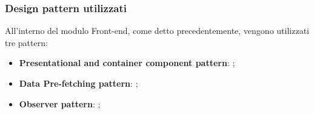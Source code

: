 \subsubsection{Design pattern utilizzati}
All'interno del modulo Front-end, come detto precedentemente, vengono utilizzati tre pattern:
\begin{itemize}
	\item \textbf{Presentational and container component pattern}: ;
	\item \textbf{Data Pre-fetching pattern}: ;
	\item \textbf{Observer pattern}: ;
\end{itemize} 